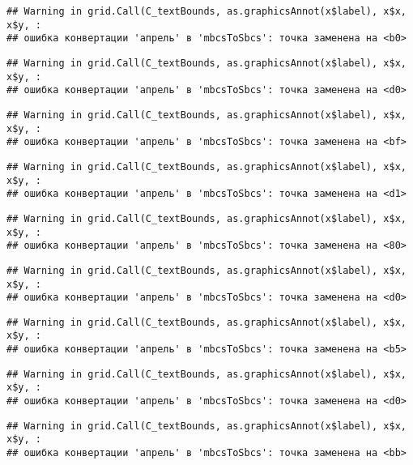 \documentclass[
]{article}
\begin{document}
\begin{verbatim}
## Warning in grid.Call(C_textBounds, as.graphicsAnnot(x$label), x$x, x$y, :
## ошибка конвертации 'апрель' в 'mbcsToSbcs': точка заменена на <b0>
\end{verbatim}

\begin{verbatim}
## Warning in grid.Call(C_textBounds, as.graphicsAnnot(x$label), x$x, x$y, :
## ошибка конвертации 'апрель' в 'mbcsToSbcs': точка заменена на <d0>
\end{verbatim}

\begin{verbatim}
## Warning in grid.Call(C_textBounds, as.graphicsAnnot(x$label), x$x, x$y, :
## ошибка конвертации 'апрель' в 'mbcsToSbcs': точка заменена на <bf>
\end{verbatim}

\begin{verbatim}
## Warning in grid.Call(C_textBounds, as.graphicsAnnot(x$label), x$x, x$y, :
## ошибка конвертации 'апрель' в 'mbcsToSbcs': точка заменена на <d1>
\end{verbatim}

\begin{verbatim}
## Warning in grid.Call(C_textBounds, as.graphicsAnnot(x$label), x$x, x$y, :
## ошибка конвертации 'апрель' в 'mbcsToSbcs': точка заменена на <80>
\end{verbatim}

\begin{verbatim}
## Warning in grid.Call(C_textBounds, as.graphicsAnnot(x$label), x$x, x$y, :
## ошибка конвертации 'апрель' в 'mbcsToSbcs': точка заменена на <d0>
\end{verbatim}

\begin{verbatim}
## Warning in grid.Call(C_textBounds, as.graphicsAnnot(x$label), x$x, x$y, :
## ошибка конвертации 'апрель' в 'mbcsToSbcs': точка заменена на <b5>
\end{verbatim}

\begin{verbatim}
## Warning in grid.Call(C_textBounds, as.graphicsAnnot(x$label), x$x, x$y, :
## ошибка конвертации 'апрель' в 'mbcsToSbcs': точка заменена на <d0>
\end{verbatim}

\begin{verbatim}
## Warning in grid.Call(C_textBounds, as.graphicsAnnot(x$label), x$x, x$y, :
## ошибка конвертации 'апрель' в 'mbcsToSbcs': точка заменена на <bb>
\end{verbatim}
\end{document}
